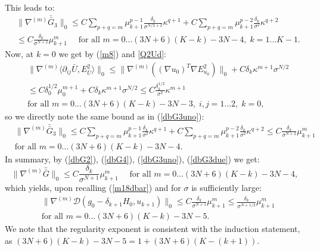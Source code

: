 \documentclass[reqno,twoside,11pt]{amsart}
\newcommand*{\dbar}[1]{\bar{\bar{#1}}}
\numberwithin{equation}{section}
\theoremstyle{plain}
\theoremstyle{definition}
\begin{document}
This leads to:
\begin{equation}\label{dbG3uno}
\begin{split}
& \|\nabla^{(m)}\dbar G_3\|_0 \leq
C\sum_{p+q=m}\mu_{k+1}^{p-1}\frac{\delta_{k}}{\sigma^{N/2+2}}\kappa^{q+1}
+ C \sum_{p+q=m}\mu_{k+1}^{p-2}\frac{\delta_{k}}{\sigma^{2}}\kappa^{q+2}
\\ & \leq C \frac{\delta_k}{\sigma^{N+2}}\mu_{k+1}^m  \quad\mbox{ for
  all } m=0\ldots (3N+6)(K-k)-3N-4,\;k=1\ldots K-1.
\end{split}
\end{equation}
Now, at $k=0$ we get by (\ref{m8}) and \ref{Q2Ud}:
\begin{equation*}
\begin{split}
& \|\nabla^{(m)}\langle \partial_{ij}\bar U,
E^2_{\bar U}\rangle\|_0\leq\|\nabla^{(m)} ((\nabla u_0)^T\nabla E^2_{u_0})
\|_0 + C\delta_k\kappa^{m+1}\sigma^{N/2} \\ & \leq  
C\delta_0^{1/2}\mu_0^{m+1} +C\delta_k\kappa^{m+1}\sigma^{N/2} \leq 
C\frac{\delta_{k}^{1/2}}{\sigma^{2}}\kappa^{m+1}   \\ & \mbox{for
  all } m=0\ldots (3N+6)(K-k)-3N-3,\; i,j=1\ldots 2,\; k=0,
\end{split}
\end{equation*}
so we directly note the same bound as in (\ref{dbG3uno}):
\begin{equation}\label{dbG3due}
\begin{split}
& \|\nabla^{(m)}\dbar G_3\|_0 \leq
C\sum_{p+q=m}\mu_{k+1}^{p-1}\frac{\delta_{k}}{\sigma^{2}}\kappa^{q+1}
+ C \sum_{p+q=m}\mu_{k+1}^{p-2}\frac{\delta_{k}}{\sigma^{2}}\kappa^{q+2}
\leq C \frac{\delta_k}{\sigma^{N+2}}\mu_{k+1}^m  \\ & 
\mbox{for all } m=0\ldots (3N+6)(K-k)-3N-4.
\end{split}
\end{equation}
In summary, by (\ref{dbG2}), (\ref{dbG4}), (\ref{dbG3uno}), (\ref{dbG3due}) we get:
\begin{equation}\label{m20dbar}
\|\nabla^{(m)}\dbar G\|_0  \leq  C \frac{\delta_k}{\sigma^{N+1}}\mu_{k+1}^m  
\quad \mbox{ for all } m=0\ldots (3N+6)(K-k)-3N-4,
\end{equation}
which yields, upon recalling  (\ref{m18dbar}) and for $\sigma$ is sufficiently large:
\begin{equation}\label{m18dbar_final}
\begin{split}
& \|\nabla^{(m)}\mathcal{D}(g_0-\delta_{k+1}H_0, u_{k+1})\|_0 
\leq C\frac{\delta_k}{\sigma^{N+1}}\mu_{k+1}^m  \leq
\frac{\delta_k}{\sigma^{N+1/2}}\mu_{k+1}^m \\ & \mbox{for all } 
m=0\ldots (3N+6)(K-k)-3N-5.
\end{split}
\end{equation}
We note that the regularity exponent is consistent with the induction
statement, as $(3N+6)(K-k)-3N-5= 1+(3N+6)(K-(k+1))$.
\end{document}
